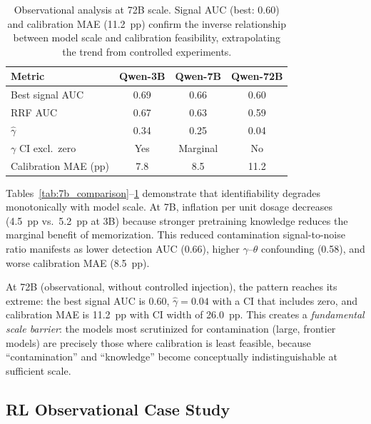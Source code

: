 \documentclass[letterpaper, 10pt, twocolumn]{article}
\begin{document}
\begin{table}[t]
\centering
\caption{Observational analysis at 72B scale. Signal AUC (best: 0.60) and calibration MAE (11.2~pp) confirm the inverse relationship between model scale and calibration feasibility, extrapolating the trend from controlled experiments.}
\label{tab:72b_comparison}
\small
\begin{tabular}{lccc}
\toprule
Metric & Qwen-3B & Qwen-7B & Qwen-72B \\
\midrule
Best signal AUC & 0.69 & 0.66 & 0.60 \\
RRF AUC & 0.67 & 0.63 & 0.59 \\
$\hat{\gamma}$ & 0.34 & 0.25 & 0.04 \\
$\gamma$ CI excl.\ zero & Yes & Marginal & No \\
Calibration MAE (pp) & 7.8 & 8.5 & 11.2 \\
\bottomrule
\end{tabular}
\end{table}

Tables~\ref{tab:7b_comparison}--\ref{tab:72b_comparison} demonstrate that identifiability degrades monotonically with model scale.
At 7B, inflation per unit dosage decreases (4.5~pp vs.\ 5.2~pp at 3B) because stronger pretraining knowledge reduces the marginal benefit of memorization.
This reduced contamination signal-to-noise ratio manifests as lower detection AUC (0.66), higher $\gamma$--$\theta$ confounding (0.58), and worse calibration MAE (8.5~pp).

At 72B (observational, without controlled injection), the pattern reaches its extreme: the best signal AUC is 0.60, $\hat{\gamma} = 0.04$ with a CI that includes zero, and calibration MAE is 11.2~pp with CI width of 26.0~pp.
This creates a \emph{fundamental scale barrier}: the models most scrutinized for contamination (large, frontier models) are precisely those where calibration is least feasible, because ``contamination'' and ``knowledge'' become conceptually indistinguishable at sufficient scale.

\subsection{RL Observational Case Study}
\label{sec:rl_case}
\end{document}
